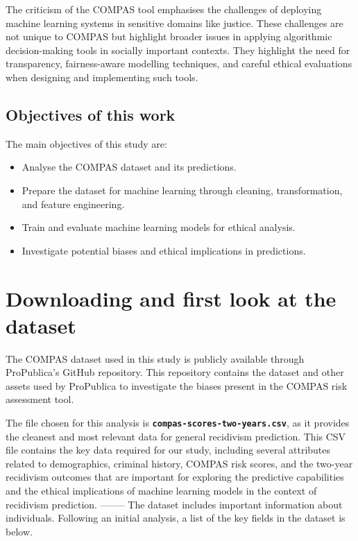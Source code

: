 \documentclass[conference]{IEEEtran}
\begin{document}
	
	The criticism of the COMPAS tool emphasises the challenges of deploying machine learning systems in sensitive domains like justice. These challenges are not unique to COMPAS but highlight broader issues in applying algorithmic decision-making tools in socially important contexts. They highlight the need for transparency, fairness-aware modelling techniques, and careful ethical evaluations when designing and implementing such tools.
	
	\subsection{Objectives of this work}
	
	The main objectives of this study are:  
	
	\begin{itemize}[]
		\item Analyse the COMPAS dataset and its predictions.
		\item Prepare the dataset for machine learning through cleaning, transformation, and feature engineering.
		\item Train and evaluate machine learning models for ethical analysis.
		\item Investigate potential biases and ethical implications in predictions.
	\end{itemize}
	
	
	\section{Downloading and first look at the dataset}
	
	The COMPAS dataset used in this study is publicly available through ProPublica's GitHub repository. This repository contains the dataset and other assets used by ProPublica to investigate the biases present in the COMPAS risk assessment tool.
	
	The file chosen for this analysis is \textbf{\texttt{compas-scores-two-years.csv}}, as it provides the cleanest and most relevant data for general recidivism prediction. This CSV file contains the key data required for our study, including several attributes related to demographics, criminal history, COMPAS risk scores, and the two-year recidivism outcomes that are important for exploring the predictive capabilities and the ethical implications of machine learning models in the context of recidivism prediction. 
	--------	
	The dataset includes important information about individuals. Following an initial analysis, a list of the key fields in the dataset is below.
	
\end{document}
